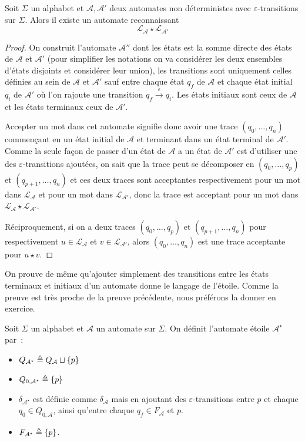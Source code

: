 \begin{proposition}\label{prop.concat.ratio}
  Soit $\Sigma$ un alphabet et $\mathcal A, \mathcal A'$ deux automates non
  déterministes avec $\varepsilon$-transitions sur $\Sigma$. Alors il existe
  un automate reconnaissant
  \[\mathcal L_\mathcal A \star \mathcal L_{\mathcal A'}\]
\end{proposition}

\begin{proof}
  On construit l'automate $\mathcal A''$ dont les états est la somme directe des
  états de $\mathcal A$ et $\mathcal A'$ (pour simplifier les notations on va
  considérer les deux ensembles d'états disjoints et considérer leur union), les
  transitions sont uniquement celles définies au sein de $\mathcal A$ et
  $\mathcal A'$ sauf entre chaque état $q_f$ de $\mathcal A$ et chaque état
  initial $q_i$ de $\mathcal A'$ où l'on rajoute une transition
  $q_f\xrightarrow{\varepsilon} q_i$. Les états initiaux sont ceux de
  $\mathcal A$ et les états terminaux ceux de $\mathcal A'$.

  Accepter un mot dans cet automate signifie donc avoir une trace
  $(q_0,\ldots,q_n)$ commençant en un état initial de $\mathcal A$ et terminant
  dans un état terminal de $\mathcal A'$. Comme la seule façon de passer d'un
  état de $\mathcal A$ a un état de $\mathcal A'$ est d'utiliser une des
  $\varepsilon$-transitions ajoutées, on sait que la trace peut se décomposer
  en $(q_0,\ldots,q_p)$ et $(q_{p+1},\ldots,q_n)$ et ces deux traces sont
  acceptantes respectivement pour un mot dans $\mathcal L_\mathcal A$ et pour un
  mot dans $\mathcal L_{\mathcal A'}$, donc la trace est acceptant pour un
  mot dans $\mathcal L_\mathcal A \star \mathcal L_{\mathcal A'}$.

  Réciproquement, si on a deux traces $(q_0,\ldots,q_p)$ et
  $(q_{p+1},\ldots,q_n)$ pour respectivement $u \in \mathcal L_{\mathcal A}$ et
  $v\in\mathcal L_{\mathcal A'}$, alors $(q_0,\ldots,q_n)$ est une trace
  acceptante pour $u\star v$.
\end{proof}

On prouve de même qu'ajouter simplement des transitions entre les états
terminaux et initiaux d'un automate donne le langage de l'étoile. Comme la
preuve est très proche de la preuve précédente, nous préférons la donner en
exercice.

\begin{definition}
  Soit $\Sigma$ un alphabet et $\mathcal A$ un automate sur $\Sigma$. On définit
  l'automate étoile $\mathcal A^\star$ par~:
  \begin{itemize}
  \item $Q_{\mathcal A^\star} \triangleq Q_\mathcal A \sqcup \{p\}$
  \item $Q_{0,\mathcal A^\star} \triangleq \{p\}$
  \item $\delta_{\mathcal A^\star}$ est définie comme $\delta_\mathcal A$ mais en
    ajoutant des $\varepsilon$-transitions entre $p$ et chaque
    $q_0\in Q_{0,\mathcal A}$, ainsi qu'entre chaque $q_f \in F_\mathcal A$ et
    $p$.
  \item $F_{\mathcal A^\star} \triangleq \{p\}$.
  \end{itemize}
\end{definition}

